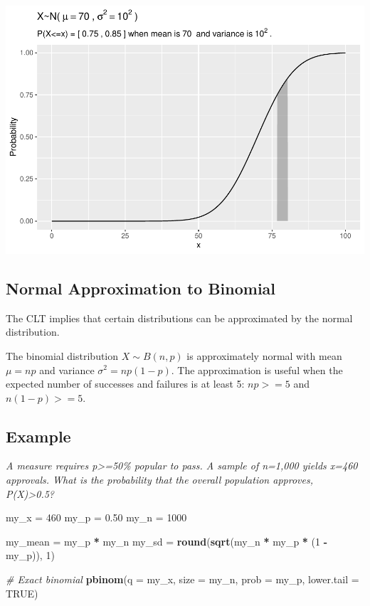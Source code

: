 \documentclass[]{book}
\newenvironment{Shaded}{\begin{snugshade}}{\end{snugshade}}
\newcommand{\CommentTok}[1]{\textcolor[rgb]{0.56,0.35,0.01}{\textit{#1}}}
\newcommand{\DataTypeTok}[1]{\textcolor[rgb]{0.13,0.29,0.53}{#1}}
\newcommand{\DecValTok}[1]{\textcolor[rgb]{0.00,0.00,0.81}{#1}}
\newcommand{\FloatTok}[1]{\textcolor[rgb]{0.00,0.00,0.81}{#1}}
\newcommand{\KeywordTok}[1]{\textcolor[rgb]{0.13,0.29,0.53}{\textbf{#1}}}
\newcommand{\NormalTok}[1]{#1}
\newcommand{\OperatorTok}[1]{\textcolor[rgb]{0.81,0.36,0.00}{\textbf{#1}}}
\newcommand{\OtherTok}[1]{\textcolor[rgb]{0.56,0.35,0.01}{#1}}
\newcommand{\StringTok}[1]{\textcolor[rgb]{0.31,0.60,0.02}{#1}}
\begin{document}
\includegraphics{data-sci_files/figure-latex/unnamed-chunk-16-1.pdf}

\hypertarget{normal-approximation-to-binomial}{%
\subsection{Normal Approximation to Binomial}\label{normal-approximation-to-binomial}}

The CLT implies that certain distributions can be approximated by the normal distribution.

The binomial distribution \(X \sim B(n,p)\) is approximately normal with mean \(\mu = n p\) and variance \(\sigma^2=np(1-p)\). The approximation is useful when the expected number of successes and failures is at least 5: \(np>=5\) and \(n(1-p)>=5\).

\hypertarget{example-4}{%
\subsection{Example}\label{example-4}}

\emph{A measure requires p\textgreater=50\% popular to pass. A sample of n=1,000 yields x=460 approvals. What is the probability that the overall population approves, P(X)\textgreater0.5?}

\begin{Shaded}
\begin{Highlighting}[]
\NormalTok{my_x =}\StringTok{ }\DecValTok{460}
\NormalTok{my_p =}\StringTok{ }\FloatTok{0.50}
\NormalTok{my_n =}\StringTok{ }\DecValTok{1000}

\NormalTok{my_mean =}\StringTok{ }\NormalTok{my_p }\OperatorTok{*}\StringTok{ }\NormalTok{my_n}
\NormalTok{my_sd =}\StringTok{ }\KeywordTok{round}\NormalTok{(}\KeywordTok{sqrt}\NormalTok{(my_n }\OperatorTok{*}\StringTok{ }\NormalTok{my_p }\OperatorTok{*}\StringTok{ }\NormalTok{(}\DecValTok{1} \OperatorTok{-}\StringTok{ }\NormalTok{my_p)), }\DecValTok{1}\NormalTok{)}

\CommentTok{# Exact binomial}
\KeywordTok{pbinom}\NormalTok{(}\DataTypeTok{q =}\NormalTok{ my_x, }\DataTypeTok{size =}\NormalTok{ my_n, }\DataTypeTok{prob =}\NormalTok{ my_p, }\DataTypeTok{lower.tail =} \OtherTok{TRUE}\NormalTok{)}
\end{Highlighting}
\end{Shaded}
\end{document}
